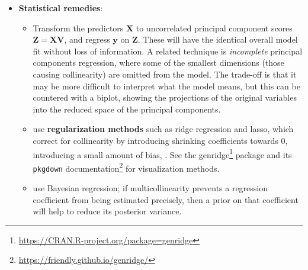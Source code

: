 \documentclass[
  letterpaper,
  10pt,
  krantz2]{krantz}
\providecommand{\href}[2]{#2\footnote{\url{#1}}}
\begin{document}
{\begin{itemize}
  \begin{itemize}
  \item
    Drop one or more regressors that have a high VIF if they are not
    deemed to be essential
  \item
    Replace highly correlated regressors with linear combination(s) of
    them. For example, two related variables, \(x_1\) and \(x_2\) can be
    replaced without any loss of information by replacing them with
    their sum and difference, \(z_1 = x_1 + x_2\) and
    \(z_2 = x_1 - x_2\). For example, in a dataset on fitness, we may
    have correlated predictors of resting pulse rate and pulse rate
    while running. Transforming these to average pulse rate and their
    difference gives new variables which are interpretable and less
    correlated.
  \end{itemize}
\item
  \textbf{Statistical remedies}:

  \begin{itemize}
  \item
    Transform the predictors \(\mathbf{X}\) to uncorrelated principal
    component scores \(\mathbf{Z} = \mathbf{X} \mathbf{V}\), and regress
    \(\mathbf{y}\) on \(\mathbf{Z}\). These will have the identical
    overall model fit without loss of information. A related technique
    is \emph{incomplete} principal components regression, where some of
    the smallest dimensions (those causing collinearity) are omitted
    from the model. The trade-off is that it may be more difficult to
    interpret what the model means, but this can be countered with a
    biplot, showing the projections of the original variables into the
    reduced space of the principal components.
  \item
    use \textbf{regularization methods} such as ridge regression and
    lasso, which correct for collinearity by introducing shrinking
    coefficients towards 0, introducing a small amount of bias, . See
    the \href{https://CRAN.R-project.org/package=genridge}{genridge}
    package and its
    \href{https://friendly.github.io/genridge/}{\texttt{pkgdown}
    documentation} for visualization methods.
  \item
    use Bayesian regression; if multicollinearity prevents a regression
    coefficient from being estimated precisely, then a prior on that
    coefficient will help to reduce its posterior variance.
  \end{itemize}
\end{itemize}

}
\end{document}
